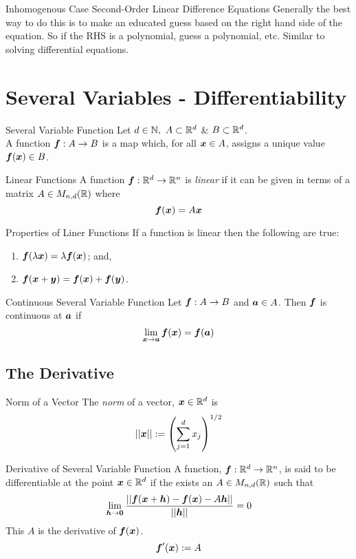 \documentclass[11pt,a4paper]{article}
\begin{document}
\subtitle{Remark 8.10 - }{Inhomogenous Case Second-Order Linear Difference Equations}
Generally the best way to do this is to make an educated guess based on the right hand side of the equation.
So if the RHS is a polynomial, guess a polynomial, etc. Similar to solving differential equations.

\section{Several Variables - Differentiability}
%
\subtitle{Definition 9.01 - }{Several Variable Function}
Let $d \in \mathbb{N},\ A \subset \mathbb{R}^d$ \& $B \subset \mathbb{R}^d$.\\
A function $\boldsymbol{f} : A \to B$ is a map which, for all $\boldsymbol{x} \in A$, assigns a unique value $\boldsymbol{f}(\boldsymbol{x}) \in B$.\\

\subtitle{Defintion 9.02 - }{Linear Functions}
A function $\boldsymbol{f} : \mathbb{R}^d \to \mathbb{R}^n$ is \textit{linear} if it can be given in terms of a matrix $A \in M_{n,d}(\mathbb{R})$ where
$$\boldsymbol{f}(\boldsymbol{x}) = A\boldsymbol{x}$$

\subtitle{Theorem 9.03 - }{Properties of Liner Functions}
If a function is linear then the following are true:
\begin{enumerate}[label=\roman*)]
  \item $\boldsymbol{f}(\lambda\boldsymbol{x}) = \lambda\boldsymbol{f}(\boldsymbol{x})$; and,
  \item $\boldsymbol{f}(\boldsymbol{x} + \boldsymbol{y}) = \boldsymbol{f}(\boldsymbol{x}) + \boldsymbol{f}(\boldsymbol{y})$.\\
\end{enumerate}

\subtitle{Definition 9.04 - }{Continuous Several Variable Function}
Let $\boldsymbol{f} : A \to B$ and $\boldsymbol{a} \in A$. Then $\boldsymbol{f}$ is continuous at $\boldsymbol{a}$ if
$$\lim_{\boldsymbol{x} \to \boldsymbol{a}}\boldsymbol{f}(\boldsymbol{x}) = \boldsymbol{f}(\boldsymbol{a})$$

\subsection{The Derivative}
%
\subtitle{Defintion 9.05 - }{Norm of a Vector}
The \textit{norm} of a vector, $\boldsymbol{x} \in \mathbb{R}^d$ is
$$||\boldsymbol{x}|| := \left( \sum_{j=1}^{d}x_j \right)^{1/2}$$

\subtitle{Definition 9.06 - }{Derivative of Several Variable Function}
A function, $\boldsymbol{f} : \mathbb{R}^d \to \mathbb{R}^n$, is said to be differentiable at the point $\boldsymbol{x} \in \mathbb{R}^d$ if the exists an $A \in M_{n,d}(\mathbb{R})$ such that
$$\lim_{\boldsymbol{h} \to \boldsymbol{0}} \frac{||\boldsymbol{f}(\boldsymbol{x} + \boldsymbol{h}) - \boldsymbol{f}(\boldsymbol{x}) -A\boldsymbol{h}||}{||\boldsymbol{h}||} = 0$$
This $A$ is the derivative of $\boldsymbol{f}(\boldsymbol{x})$.
$$\boldsymbol{f}'(\boldsymbol{x}) := A$$
\end{document}
